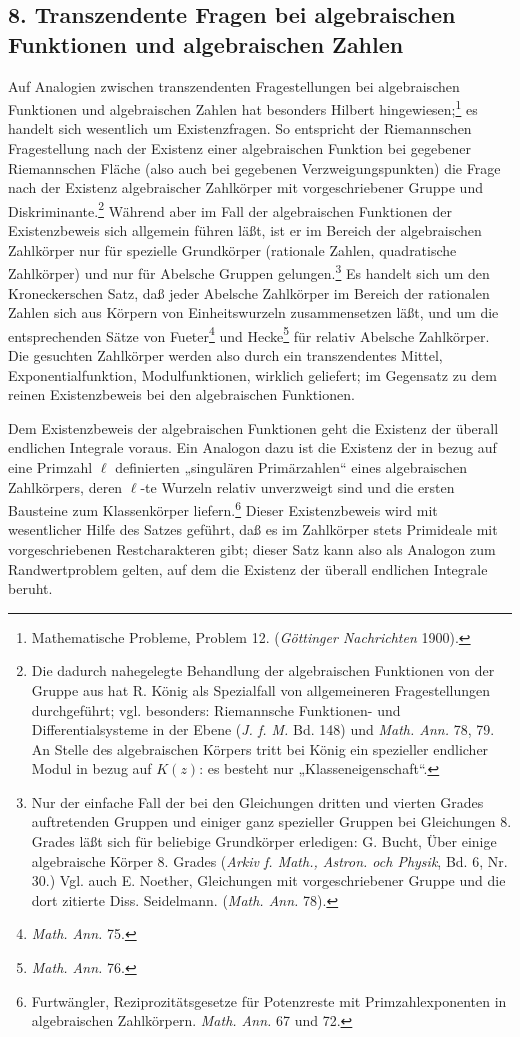\documentclass[11pt]{article}
\begin{document}
\subsection*{8. Transzendente Fragen bei algebraischen Funktionen und algebraischen Zahlen}
Auf Analogien zwischen transzendenten Fragestellungen bei algebraischen Funktionen und algebraischen Zahlen hat besonders Hilbert hingewiesen;\footnote{Mathematische Probleme, Problem 12. (\emph{Göttinger Nachrichten} 1900).} es handelt sich wesentlich um Existenzfragen. So entspricht der Riemannschen Fragestellung nach der Existenz einer algebraischen Funktion bei gegebener Riemannschen Fläche (also auch bei gegebenen Verzweigungspunkten) die Frage nach der Existenz algebraischer Zahlkörper mit vorgeschriebener Gruppe und Diskriminante.\footnote{Die dadurch nahegelegte Behandlung der algebraischen Funktionen von der Gruppe aus hat R. König als Spezialfall von allgemeineren Fragestellungen durchgeführt; vgl. besonders: Riemannsche Funktionen- und Differentialsysteme in der Ebene (\emph{J. f. M.} Bd. 148) und \emph{Math. Ann.} 78, 79. An Stelle des algebraischen Körpers tritt bei König ein spezieller endlicher Modul in bezug auf \(K(z)\): es besteht nur „Klasseneigenschaft“.} Während aber im Fall der algebraischen Funktionen der Existenzbeweis sich allgemein führen läßt, ist er im Bereich der algebraischen Zahlkörper nur für spezielle Grundkörper (rationale Zahlen, quadratische Zahlkörper) und nur für Abelsche Gruppen gelungen.\footnote{Nur der einfache Fall der bei den Gleichungen dritten und vierten Grades auftretenden Gruppen und einiger ganz spezieller Gruppen bei Gleichungen 8. Grades läßt sich für beliebige Grundkörper erledigen: G. Bucht, Über einige algebraische Körper 8. Grades (\emph{Arkiv f. Math., Astron. och Physik}, Bd. 6, Nr. 30.) Vgl. auch E. Noether, Gleichungen mit vorgeschriebener Gruppe und die dort zitierte Diss. Seidelmann. (\emph{Math. Ann.} 78).} Es handelt sich um den Kroneckerschen Satz, daß jeder Abelsche Zahlkörper im Bereich der rationalen Zahlen sich aus Körpern von Einheitswurzeln zusammensetzen läßt, und um die entsprechenden Sätze von Fueter\footnote{\emph{Math. Ann.} 75.} und Hecke\footnote{\emph{Math. Ann.} 76.} für relativ Abelsche Zahlkörper. Die gesuchten Zahlkörper werden also durch ein transzendentes Mittel, Exponentialfunktion, Modulfunktionen, wirklich geliefert; im Gegensatz zu dem reinen Existenzbeweis bei den algebraischen Funktionen.

Dem Existenzbeweis der algebraischen Funktionen geht die Existenz der überall endlichen Integrale voraus. Ein Analogon dazu ist die Existenz der in bezug auf eine Primzahl \(\ell\) definierten „singulären Primärzahlen“ eines algebraischen Zahlkörpers, deren \(\ell\)-te Wurzeln relativ unverzweigt sind und die ersten Bausteine zum Klassenkörper liefern.\footnote{Furtwängler, Reziprozitätsgesetze für Potenzreste mit Primzahlexponenten in algebraischen Zahlkörpern. \emph{Math. Ann.} 67 und 72.} Dieser Existenzbeweis wird mit wesentlicher Hilfe des Satzes geführt, daß es im Zahlkörper stets Primideale mit vorgeschriebenen Restcharakteren gibt; dieser Satz kann also als Analogon zum Randwertproblem gelten, auf dem die Existenz der überall endlichen Integrale beruht.
\end{document}
